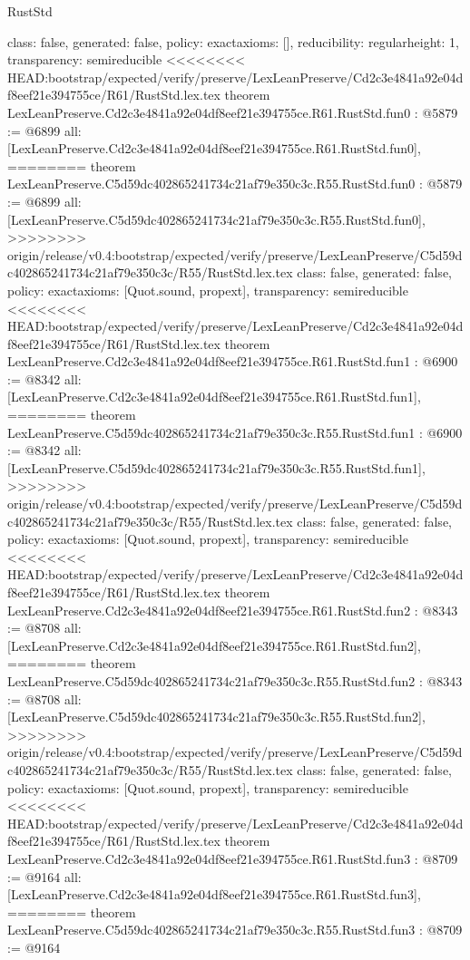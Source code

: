 \begin{lexlean}{RustStd}
\begin{coremodule}
{\begin{coremodule}
{{{  class: false,
  generated: false,
  policy: exact{axioms: []},
  reducibility: regular{height: 1},
  transparency: semireducible
}
<<<<<<<< HEAD:bootstrap/expected/verify/preserve/LexLeanPreserve/Cd2c3e4841a92e04df8eef21e394755ce/R61/RustStd.lex.tex
theorem LexLeanPreserve.Cd2c3e4841a92e04df8eef21e394755ce.R61.RustStd.fun0 : @5879 := @6899 {
  all: [LexLeanPreserve.Cd2c3e4841a92e04df8eef21e394755ce.R61.RustStd.fun0],
========
theorem LexLeanPreserve.C5d59dc402865241734c21af79e350c3c.R55.RustStd.fun0 : @5879 := @6899 {
  all: [LexLeanPreserve.C5d59dc402865241734c21af79e350c3c.R55.RustStd.fun0],
>>>>>>>> origin/release/v0.4:bootstrap/expected/verify/preserve/LexLeanPreserve/C5d59dc402865241734c21af79e350c3c/R55/RustStd.lex.tex
  class: false,
  generated: false,
  policy: exact{axioms: [Quot.sound, propext]},
  transparency: semireducible
}
<<<<<<<< HEAD:bootstrap/expected/verify/preserve/LexLeanPreserve/Cd2c3e4841a92e04df8eef21e394755ce/R61/RustStd.lex.tex
theorem LexLeanPreserve.Cd2c3e4841a92e04df8eef21e394755ce.R61.RustStd.fun1 : @6900 := @8342 {
  all: [LexLeanPreserve.Cd2c3e4841a92e04df8eef21e394755ce.R61.RustStd.fun1],
========
theorem LexLeanPreserve.C5d59dc402865241734c21af79e350c3c.R55.RustStd.fun1 : @6900 := @8342 {
  all: [LexLeanPreserve.C5d59dc402865241734c21af79e350c3c.R55.RustStd.fun1],
>>>>>>>> origin/release/v0.4:bootstrap/expected/verify/preserve/LexLeanPreserve/C5d59dc402865241734c21af79e350c3c/R55/RustStd.lex.tex
  class: false,
  generated: false,
  policy: exact{axioms: [Quot.sound, propext]},
  transparency: semireducible
}
<<<<<<<< HEAD:bootstrap/expected/verify/preserve/LexLeanPreserve/Cd2c3e4841a92e04df8eef21e394755ce/R61/RustStd.lex.tex
theorem LexLeanPreserve.Cd2c3e4841a92e04df8eef21e394755ce.R61.RustStd.fun2 : @8343 := @8708 {
  all: [LexLeanPreserve.Cd2c3e4841a92e04df8eef21e394755ce.R61.RustStd.fun2],
========
theorem LexLeanPreserve.C5d59dc402865241734c21af79e350c3c.R55.RustStd.fun2 : @8343 := @8708 {
  all: [LexLeanPreserve.C5d59dc402865241734c21af79e350c3c.R55.RustStd.fun2],
>>>>>>>> origin/release/v0.4:bootstrap/expected/verify/preserve/LexLeanPreserve/C5d59dc402865241734c21af79e350c3c/R55/RustStd.lex.tex
  class: false,
  generated: false,
  policy: exact{axioms: [Quot.sound, propext]},
  transparency: semireducible
}
<<<<<<<< HEAD:bootstrap/expected/verify/preserve/LexLeanPreserve/Cd2c3e4841a92e04df8eef21e394755ce/R61/RustStd.lex.tex
theorem LexLeanPreserve.Cd2c3e4841a92e04df8eef21e394755ce.R61.RustStd.fun3 : @8709 := @9164 {
  all: [LexLeanPreserve.Cd2c3e4841a92e04df8eef21e394755ce.R61.RustStd.fun3],
========
theorem LexLeanPreserve.C5d59dc402865241734c21af79e350c3c.R55.RustStd.fun3 : @8709 := @9164 {
}}}}}}}
\end{coremodule}}
\end{coremodule}
\end{lexlean}
